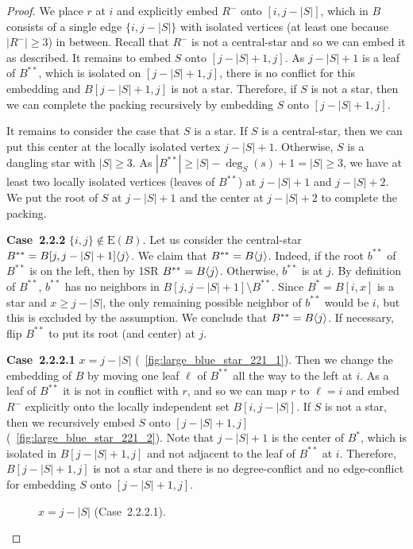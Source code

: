 \documentclass[11pt,a4paper,colorlinks=true,urlcolor=blue,citecolor=red]{article}
\theoremstyle{plain}
\newcommand{\case}[1]{\par\vspace{.5\baselineskip}\noindent\textbf{\sffamily Case~#1}}
\newcommand{\EB}{\mathrm{E}(B)}
\begin{document}
\begin{proof}
  We place $r$ at $i$ and explicitly embed $R^-$ onto $[i,j-|S|]$, which
  in $B$ consists of a single edge $\{i,j-|S|\}$ with isolated vertices
  (at least one because $|R^-|\ge 3$) in between. Recall that $R^-$ is
  not a central-star and so we can embed it as described. It remains to
  embed $S$ onto $[j-|S|+1,j]$. As $j-|S|+1$ is a leaf of $B^{**}$,
  which is isolated on $[j-|S|+1,j]$, there is no conflict for this
  embedding and $B[j-|S|+1,j]$ is not a star. Therefore, if $S$ is not a
  star, then we can complete the packing recursively by embedding $S$
  onto $[j-|S|+1,j]$.

  It remains to consider the case that $S$ is a star. If $S$ is a
  central-star, then we can put this center at the locally isolated
  vertex $j-|S|+1$. Otherwise, $S$ is a dangling star with $|S|\ge 3$.
  As $|B^{**}|\ge|S|-\deg_S(s)+1=|S|\ge 3$, we have at least two locally
  isolated vertices (leaves of $B^{**}$) at $j-|S|+1$ and $j-|S|+2$. We
  put the root of $S$ at $j-|S|+1$ and the center at $j-|S|+2$ to
  complete the packing.

  \case{2.2.2} $\{i,j\}\notin\EB$. Let us consider the
  central-star $B^{**}=B{[j,j-|S|+1]}\langle{j}\rangle$. We claim that
  $B^{**}=B\langle{j}\rangle$. Indeed, if the root $b^{**}$ of $B^{**}$ is on
  the left, then by 1SR $B^{**}=B\langle{j}\rangle$. Otherwise, $b^{**}$ is at
  $j$. By definition of $B^{**}$, $b^{**}$ has no neighbors in
  $B[j,j-|S|+1]\setminus B^{**}$. Since $B^*=B[i,x]$ is a star and
  $x\geq j-|S|$, the only remaining possible neighbor of $b^{**}$ would
  be $i$, but this is excluded by the assumption. We conclude that
  $B^{**}=B\langle{j}\rangle$. If necessary, flip $B^{**}$ to put its root (and
  center) at $j$.

  \case{2.2.2.1} $x=j-|S|$
  (\figurename~\ref{fig:large_blue_star_221_1}). Then we change the
  embedding of $B$ by moving one leaf $\ell$ of $B^{**}$ all the way to
  the left at $i$. As a leaf of $B^{**}$ it is not in conflict with $r$,
  and so we can map $r$ to $\ell=i$ and embed $R^-$ explicitly onto the
  locally independent set $B[i,j-|S|]$. If $S$ is not a star, then we
  recursively embed $S$ onto $[j-|S|+1,j]$
  (\figurename~\ref{fig:large_blue_star_221_2}). Note that $j-|S|+1$ is
  the center of $B^*$, which is isolated in $B[j-|S|+1,j]$ and not
  adjacent to the leaf of $B^{**}$ at $i$. Therefore, $B[j-|S|+1,j]$ is
  not a star and there is no degree-conflict and no edge-conflict for
  embedding $S$ onto $[j-|S|+1,j]$.
\begin{figure}[htbp]
    \centering\hfil {}\hfil
    \hfil
    \caption{$x=j-|S|$ (Case~2.2.2.1).\label{fig:large_blue_star_221}}
  \end{figure}



\end{proof}
\end{document}
